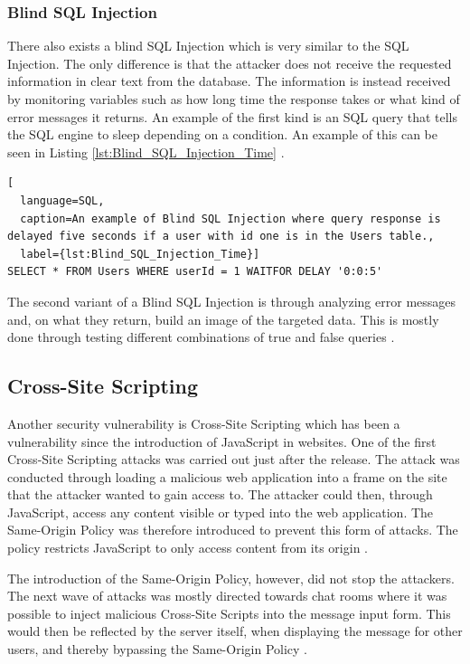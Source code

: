 \subsubsection{Blind SQL Injection}
There also exists a blind SQL Injection which is very similar to the SQL Injection. The only difference is that the attacker does not receive the requested information in clear text from the database. The information is instead received by monitoring variables such as how long time the response takes or what kind of error messages it returns. An example of the first kind is an SQL query that tells the SQL engine to sleep depending on a condition. An example of this can be seen in Listing \ref{lst:Blind_SQL_Injection_Time} \parencite{JustinClarke-Salt2009SIAa, Secure_Web}.

\hfill
\begin{lstlisting}[
  language=SQL,
  caption=An example of Blind SQL Injection where query response is delayed five seconds if a user with id one is in the Users table.,
  label={lst:Blind_SQL_Injection_Time}]
SELECT * FROM Users WHERE userId = 1 WAITFOR DELAY '0:0:5'
\end{lstlisting}
\hfill

The second variant of a Blind SQL Injection is through analyzing error messages and, on what they return, build an image of the targeted data. This is mostly done through testing different combinations of true and false queries \parencite{JustinClarke-Salt2009SIAa, Secure_Web}.



\subsection{Cross-Site Scripting}
Another security vulnerability is Cross-Site Scripting which has been a vulnerability since the introduction of JavaScript in websites. One of the first Cross-Site Scripting attacks was carried out just after the release. The attack was conducted through loading a malicious web application into a frame on the site that the attacker wanted to gain access to. The attacker could then, through JavaScript, access any content visible or typed into the web application. The  Same-Origin Policy was therefore introduced to prevent this form of attacks. The policy restricts JavaScript to only access content from its origin \parencite{FogieSeth2007Xacs, w3csop}.

The introduction of the Same-Origin Policy, however, did not stop the attackers. The next wave of attacks was mostly directed towards chat rooms where it was possible to inject malicious Cross-Site Scripts into the message input form. This would then be reflected by the server itself, when displaying the message for other users, and thereby bypassing the Same-Origin Policy \parencite{FogieSeth2007Xacs}.

